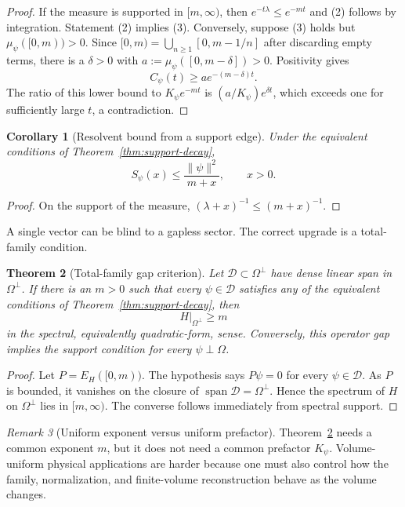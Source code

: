 \documentclass[11pt,a4paper]{article}
\newtheorem{theorem}{Theorem}[section]
\newtheorem{corollary}[theorem]{Corollary}
\theoremstyle{definition}
\theoremstyle{remark}
\newtheorem{remark}[theorem]{Remark}
\newcommand{\Span}{\operatorname{span}}
\begin{document}
\begin{proof}
If the measure is supported in $[m,\infty)$, then
$e^{-t\lambda}\leq e^{-mt}$ and (2) follows by integration.  Statement (2)
implies (3).  Conversely, suppose (3) holds but
$\mu_\psi([0,m))>0$.  Since
$[0,m)=\bigcup_{n\geq1}[0,m-1/n]$ after discarding empty terms, there is a
$\delta>0$ with $a:=\mu_\psi([0,m-\delta])>0$.  Positivity gives
\[
  C_\psi(t)\geq a e^{-(m-\delta)t}.
\]
The ratio of this lower bound to $K_\psi e^{-mt}$ is
$(a/K_\psi)e^{\delta t}$, which exceeds one for sufficiently large $t$, a
contradiction.
\end{proof}

\begin{corollary}[Resolvent bound from a support edge]
\label{cor:resolvent-bound}
Under the equivalent conditions of Theorem~\ref{thm:support-decay},
\[
  S_\psi(x)\leq\frac{\|\psi\|^2}{m+x},\qquad x>0.
  \label{eq:resolvent-bound}
\]
\end{corollary}

\begin{proof}
On the support of the measure,
$(\lambda+x)^{-1}\leq(m+x)^{-1}$.
\end{proof}

A single vector can be blind to a gapless sector.  The correct upgrade is a
total-family condition.

\begin{theorem}[Total-family gap criterion]
\label{thm:total-family}
Let $\mathcal D\subset\Omega^\perp$ have dense linear span in
$\Omega^\perp$.  If there is an $m>0$ such that every $\psi\in\mathcal D$
satisfies any of the equivalent conditions of
Theorem~\ref{thm:support-decay}, then
\[
  H|_{\Omega^\perp}\geq m
\]
in the spectral, equivalently quadratic-form, sense.  Conversely, this operator
gap implies the support condition for every $\psi\perp\Omega$.
\end{theorem}

\begin{proof}
Let $P=E_H([0,m))$.  The hypothesis says $P\psi=0$ for every
$\psi\in\mathcal D$.  As $P$ is bounded, it vanishes on the closure of
$\Span\mathcal D=\Omega^\perp$.  Hence the spectrum of $H$ on
$\Omega^\perp$ lies in $[m,\infty)$.  The converse follows immediately from
spectral support.
\end{proof}

\begin{remark}[Uniform exponent versus uniform prefactor]
Theorem~\ref{thm:total-family} needs a common exponent $m$, but it does not
need a common prefactor $K_\psi$.  Volume-uniform physical applications are
harder because one must also control how the family, normalization, and
finite-volume reconstruction behave as the volume changes.
\end{remark}
\end{document}
